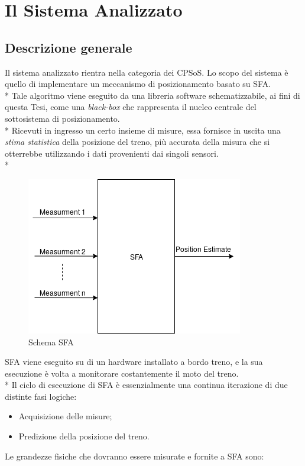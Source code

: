 \chapter{Il Sistema Analizzato}
\section{Descrizione generale}
Il sistema analizzato rientra nella categoria dei CPSoS. Lo scopo del sistema \`e quello di implementare un meccanismo di posizionamento basato su SFA.\\*
Tale algoritmo viene eseguito da una libreria software schematizzabile, ai fini di questa Tesi, come una \emph{black-box} che rappresenta il nucleo centrale del sottosistema di posizionamento.\\*
Ricevuti in ingresso un certo insieme di misure, essa fornisce in uscita una \emph{stima statistica} della posizione del treno, pi\`u accurata della misura che si otterrebbe utilizzando i dati provenienti dai singoli sensori.\cite{datafuse}\\*
\begin{figure}[h]
	\centering
	\includegraphics[scale=0.6]{img/sfaschema}
	\caption{Schema SFA}
	\label{fig:sfa}
\end{figure}
\clearpage
SFA viene eseguito su di un hardware installato a bordo treno, e la sua esecuzione \`e volta a monitorare costantemente il moto del treno.\\*
Il ciclo di esecuzione di SFA \`e essenzialmente una continua iterazione di due distinte fasi logiche:
\begin{itemize}
	\item Acquisizione delle misure;
	\item Predizione della posizione del treno.
\end{itemize}
Le grandezze fisiche che dovranno essere misurate e fornite a SFA sono:
